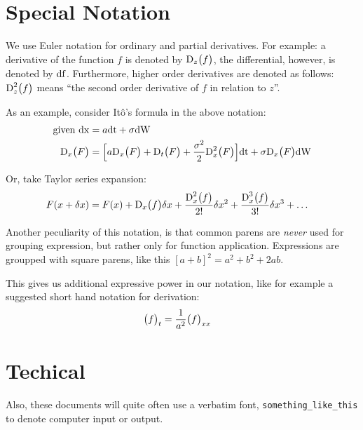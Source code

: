 \documentclass{article}
\begin{document}
\section{Special Notation}
We use Euler notation for ordinary and partial derivatives. For example: a derivative of the function $f$ is denoted by $\df[z]{f}$, the differential, however, is denoted by ${\rm{df}}$. Furthermore, higher order derivatives are denoted as follows: $\ddf[z]{f}$ means ``the second order derivative of $f$ in relation to $z$''.

As an example, consider It\^o's formula in the above notation:
\begin{align*}
	\text{given } \dif{x} &= a\dif{t} + \sigma\dif{W} \\
	\df{F} &= {\Big[a\df{F} + \df[t]{F} + \frac{\sigma^2}{2}\ddf{F}\Big]
		\dif{t} + \sigma\df{F}\dif{W}}
\end{align*}

Or, take Taylor series expansion:
\begin{align*}
	F(x + \delta{}x) &= {F(x) + \df{f}\delta{}x + 
		\frac{\ddf{f}}{2!} \delta{}x^2 + 
		\frac{\dddf{f}}{3!}\delta{}x^3 + \dots}
\end{align*}

Another peculiarity of this notation, is that common parens are \emph{never} used for
grouping expression, but rather only for function application. Expressions are groupped with square parens, like this $[a+b]^2 = a^2 + b^2 + 2ab$.

This gives us additional expressive power in our notation, like for example a suggested short hand notation for derivation:
\begin{align*}
	\ds[t]{f} &= \frac{1}{a^2}\dds{f}
\end{align*}


\section{Techical}

Also, these documents will quite often use a verbatim font, \Verb|something_like_this| to denote computer input or output.
\end{document}
